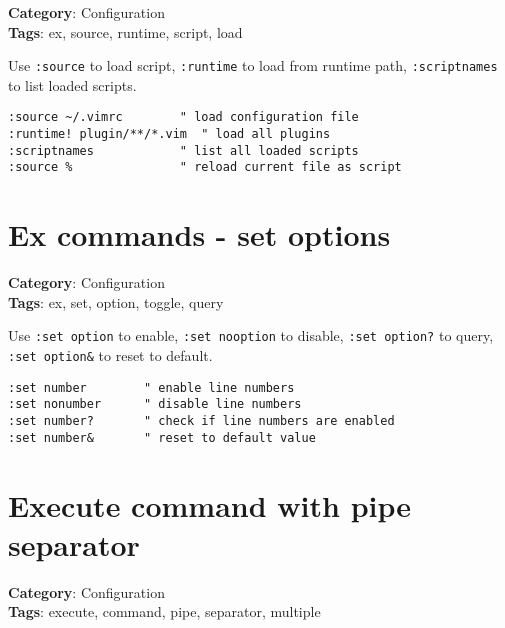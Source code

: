 {{{\textbf{Category}: Configuration\\ \textbf{Tags}: ex, source, runtime, script, load
\vspace{0.5cm}

Use {\footnotesize \Verb§:source§} to load script, {\footnotesize \Verb§:runtime§} to load from runtime path, {\footnotesize \Verb§:scriptnames§} to list loaded scripts.

\begin{Exa*}{}
\begin{Verbatim}[fontsize=\footnotesize, breaklines, breakanywhere]
:source ~/.vimrc        " load configuration file
:runtime! plugin/**/*.vim  " load all plugins
:scriptnames            " list all loaded scripts
:source %               " reload current file as script
\end{Verbatim}
\end{Exa*}

\section{Ex commands - set options}

\textbf{Category}: Configuration\\ \textbf{Tags}: ex, set, option, toggle, query
\vspace{0.5cm}

Use {\footnotesize \Verb§:set option§} to enable, {\footnotesize \Verb§:set nooption§} to disable, {\footnotesize \Verb§:set option?§} to query, {\footnotesize \Verb§:set option&§} to reset to default.

\begin{Exa*}{}
\begin{Verbatim}[fontsize=\footnotesize, breaklines, breakanywhere]
:set number        " enable line numbers
:set nonumber      " disable line numbers
:set number?       " check if line numbers are enabled
:set number&       " reset to default value
\end{Verbatim}
\end{Exa*}

\section{Execute command with pipe separator}

\textbf{Category}: Configuration\\ \textbf{Tags}: execute, command, pipe, separator, multiple
\vspace{0.5cm}

}}}

